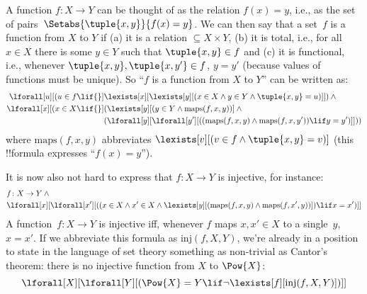 \documentclass[../../include/open-logic-section]{subfiles}
\begin{document}
A function $f \colon X \to Y$ can be thought of as the relation $f(x)
= y$, i.e., as the set of pairs~$\Setabs{\tuple{x,y}}{f(x) = y}$. We
can then say that a set~$f$ is a function from $X$ to $Y$ if (a) it is
a relation $\subseteq X \times Y$, (b) it is total, i.e., for all $x
\in X$ there is some $y \in Y$ such that $\tuple{x, y} \in f$ and (c)
it is functional, i.e., whenever $\tuple{x, y}, \tuple{x, y'} \in f$,
$y = y'$ (because values of functions must be unique). So ``$f$ is a
function from $X$ to $Y$'' can be written as:
\begin{align*}
 \lforall[u][(u \in f \lif {}] & \lexists[x][\lexists[y][(x \in X \land y \in
      Y \land \tuple{x, y} = u)]]) \land {}\\
 \lforall[x][(x \in X \lif {}] & 
      (\lexists[y][(y \in Y \land \mathrm{maps}(f, x, y))] \land {}\\
& (\lforall[y][\lforall[y'][((\mathrm{maps}(f, x, y) \land
    \mathrm{maps}(f, x, y')) \lif y = y')]]))
\end{align*}
where $\mathrm{maps}(f, x, y)$ abbreviates $\lexists[v][(v \in f \land
  \tuple{x, y} = v)]$ (this !!{formula} expresses ``$f(x) = y$'').

It is now also not hard to express that $f\colon X \to Y$ is
injective, for instance:
\begin{align*}
& f \colon X \to Y \land {}\\
& \lforall[x][\lforall[x'][((x \in X \land x' \in
    X \land \lexists[y][(\mathrm{maps}(f, x, y) \land \mathrm{maps}(f,
        x', y))]) \lif x = x')]]
\end{align*}
A function~$f\colon X \to Y$ is injective iff, whenever $f$ maps $x, x'
\in X$ to a single~$y$, $x = x'$.  If we abbreviate this formula as
$\mathrm{inj}(f, X, Y)$, we're already in a position to state in the
language of set theory something as non-trivial as Cantor's theorem:
there is no injective function from $X$ to $\Pow{X}$:
\[
\lforall[X][\lforall[Y][(\Pow{X} = Y \lif
    \lnot\lexists[f][\mathrm{inj}(f, X, Y)])]]
\]
\end{document}
